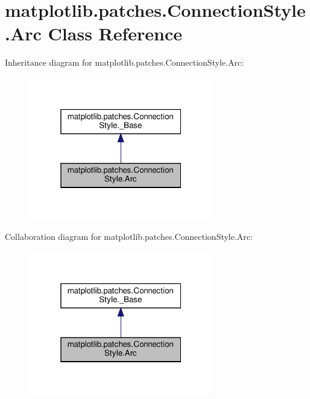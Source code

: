 \hypertarget{classmatplotlib_1_1patches_1_1ConnectionStyle_1_1Arc}{}\section{matplotlib.\+patches.\+Connection\+Style.\+Arc Class Reference}
\label{classmatplotlib_1_1patches_1_1ConnectionStyle_1_1Arc}


Inheritance diagram for matplotlib.\+patches.\+Connection\+Style.\+Arc\+:
\nopagebreak
\begin{figure}[H]
\begin{center}
\leavevmode
\includegraphics[width=229pt]{classmatplotlib_1_1patches_1_1ConnectionStyle_1_1Arc__inherit__graph}
\end{center}
\end{figure}


Collaboration diagram for matplotlib.\+patches.\+Connection\+Style.\+Arc\+:
\nopagebreak
\begin{figure}[H]
\begin{center}
\leavevmode
\includegraphics[width=229pt]{classmatplotlib_1_1patches_1_1ConnectionStyle_1_1Arc__coll__graph}
\end{center}
\end{figure}
